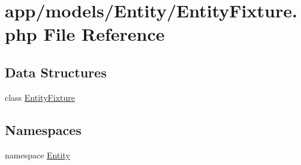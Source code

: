\hypertarget{_entity_fixture_8php}{\section{app/models/\-Entity/\-Entity\-Fixture.php File Reference}
\label{_entity_fixture_8php}
}
\subsection*{Data Structures}
\begin{DoxyCompactItemize}
\item 
class \hyperlink{class_entity_1_1_entity_fixture}{Entity\-Fixture}
\end{DoxyCompactItemize}
\subsection*{Namespaces}
\begin{DoxyCompactItemize}
\item 
namespace \hyperlink{namespace_entity}{Entity}
\end{DoxyCompactItemize}
